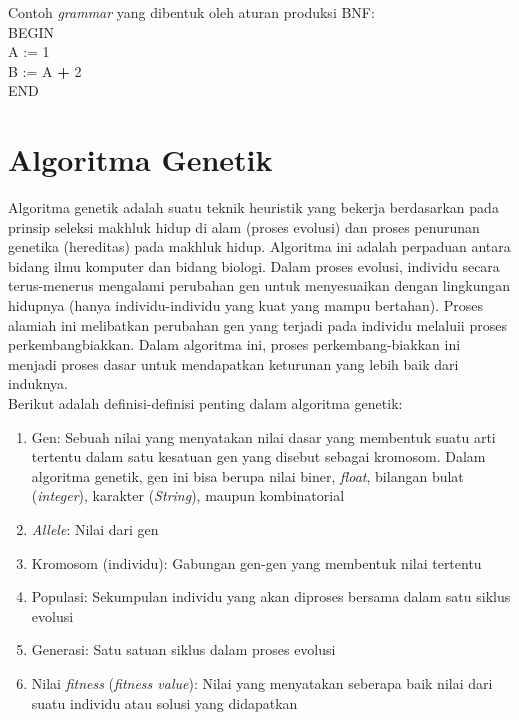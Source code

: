 Contoh \textit{grammar} yang dibentuk oleh aturan produksi BNF:
\\
	BEGIN
\\
	A := 1
\\
	B := A \textbf{+} 2
\\
	END

\section{Algoritma Genetik}
\label{sec:AG}

Algoritma genetik adalah suatu teknik heuristik yang bekerja berdasarkan pada prinsip seleksi makhluk hidup di alam (proses evolusi) dan proses penurunan genetika (hereditas) pada makhluk hidup. Algoritma ini adalah perpaduan antara bidang ilmu komputer dan bidang biologi. Dalam proses evolusi, individu secara terus-menerus mengalami perubahan gen untuk menyesuaikan dengan lingkungan hidupnya (hanya individu-individu yang kuat yang mampu bertahan). Proses alamiah ini melibatkan perubahan gen yang terjadi pada individu melaluii proses perkembangbiakkan. Dalam algoritma ini, proses perkembang-biakkan ini menjadi proses dasar untuk mendapatkan keturunan yang lebih baik dari induknya. 
\\
Berikut adalah definisi-definisi penting dalam algoritma genetik:

\begin{enumerate}[1.]

	\item Gen: Sebuah nilai yang menyatakan nilai dasar yang membentuk suatu arti tertentu dalam satu kesatuan gen yang disebut sebagai kromosom. Dalam algoritma genetik, gen ini bisa berupa nilai biner, \textit{float}, bilangan bulat (\textit{integer}), karakter 		           (\textit{String}), maupun kombinatorial
	\item \textit{Allele}: Nilai dari gen
	\item Kromosom (individu): Gabungan gen-gen yang membentuk nilai tertentu
	\item Populasi: Sekumpulan individu yang akan diproses bersama dalam satu siklus evolusi
	\item Generasi: Satu satuan siklus dalam proses evolusi 
	\item Nilai \textit{fitness} (\textit{fitness value}): Nilai yang menyatakan seberapa baik nilai dari suatu individu atau solusi yang didapatkan

\end{enumerate}

